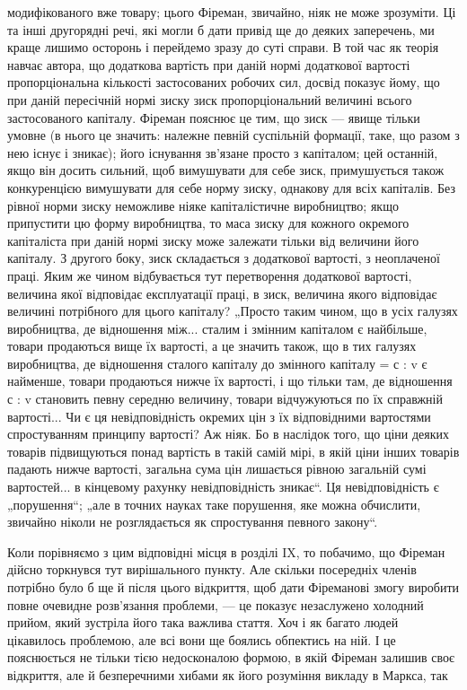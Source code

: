 \parcont{}  %
модифікованого вже товару; цього Фіреман, звичайно, ніяк не
може зрозуміти. Ці та інші другорядні речі, які могли б дати
привід ще до деяких заперечень, ми краще лишимо осторонь
і перейдемо зразу до суті справи. В той час як теорія навчає
автора, що додаткова вартість при даній нормі додаткової вартості
пропорціональна кількості застосованих робочих сил, досвід
показує йому, що при даній пересічній нормі зиску зиск
пропорціональний величині всього застосованого капіталу. Фіреман
пояснює це тим, що зиск — явище тільки умовне (в нього
це значить: належне певній суспільній формації, таке, що разом
з нею існує і зникає); його існування зв’язане просто з капіталом;
цей останній, якщо він досить сильний, щоб вимушувати
для себе зиск, примушується також конкуренцією вимушувати
для себе норму зиску, однакову для всіх капіталів. Без рівної
норми зиску неможливе ніяке капіталістичне виробництво; якщо
припустити цю форму виробництва, то маса зиску для кожного
окремого капіталіста при даній нормі зиску може залежати тільки
від величини його капіталу. З другого боку, зиск складається
з додаткової вартості, з неоплаченої праці. Яким же чином відбувається
тут перетворення додаткової вартості, величина якої
відповідає експлуатації праці, в зиск, величина якого відповідає
величині потрібного для цього капіталу? „Просто таким чином,
що в усіх галузях виробництва, де відношення між... сталим
і змінним капіталом є найбільше, товари продаються вище їх
вартості, а це значить також, що в тих галузях виробництва,
де відношення сталого капіталу до змінного капіталу = с : v є
найменше, товари продаються нижче їх вартості, і що тільки
там, де відношення с : v становить певну середню величину,
товари відчужуються по їх справжній вартості... Чи є ця невідповідність
окремих цін з їх відповідними вартостями спростуванням
принципу вартості? Аж ніяк. Бо в наслідок того, що
ціни деяких товарів підвищуються понад вартість в такій самій
мірі, в якій ціни інших товарів падають нижче вартості, загальна
сума цін лишається рівною загальній сумі вартостей...
в кінцевому рахунку невідповідність зникає“. Ця невідповідність
є „порушення“; „але в точних науках таке порушення, яке можна
обчислити, звичайно ніколи не розглядається як спростування
певного закону“.

Коли порівняємо з цим відповідні місця в розділі IX, то побачимо,
що Фіреман дійсно торкнувся тут вирішального пункту.
Але скільки посередніх членів потрібно було б ще й після цього
відкриття, щоб дати Фіреманові змогу виробити повне очевидне
розв’язання проблеми, — це показує незаслужено холодний
прийом, який зустріла його така важлива стаття. Хоч і як багато
людей цікавилось проблемою, але всі вони ще боялись обпектись
на ній. І це пояснюється не тільки тією недосконалою
формою, в якій Фіреман залишив своє відкриття, але й безперечними
хибами як його розуміння викладу в Маркса, так
\parbreak{}  %
